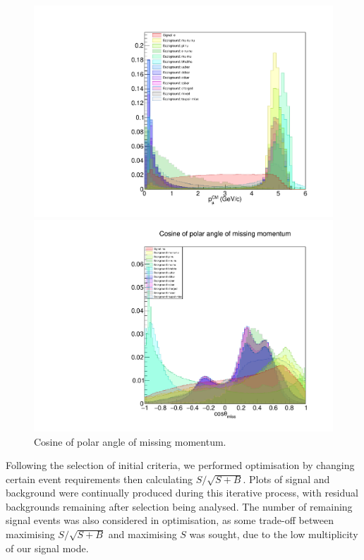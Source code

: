 \documentclass[12pt]{thesis}  %
\begin{document}
\begin{figure}[h]
\centering
\begin{minipage}{.475\textwidth}
  \centering
  \includegraphics[width=\linewidth]{images/tauMG-muCM_P.pdf}
  \caption[]%
  {\small Center-of-mass frame momentum of signal track.}
  \label{fig:good sep}
\end{minipage}%
\hfill
\begin{minipage}{.475\textwidth}
  \centering
  \includegraphics[width=\linewidth]{images/tauMG-missingCosTheta.pdf}
  \caption[]%
  {\small Cosine of polar angle of missing momentum.}
  \label{fig:bad sep}
\end{minipage}
\end{figure}

Following the selection of initial criteria, we performed optimisation by changing certain event requirements then calculating $S/\sqrt{S+B}$. Plots of signal and background were continually produced during this iterative process, with residual backgrounds remaining after selection being analysed. The number of remaining signal events was also considered in optimisation, as some trade-off between maximising $S/\sqrt{S+B}$ and maximising $S$ was sought, due to the low multiplicity of our signal mode.
\end{document}
